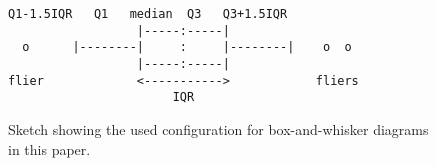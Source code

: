 \begin{figure}[htb]
    \centering
\begin{Verbatim}[fontsize=\footnotesize,frame=single,samepage=true]
     Q1-1.5IQR   Q1   median  Q3   Q3+1.5IQR
                  |-----:-----|
  o      |--------|     :     |--------|    o  o
                  |-----:-----|
flier             <----------->            fliers
                       IQR
\end{Verbatim}
    \caption{Sketch showing the used configuration for box-and-whisker diagrams in this paper.}
    \label{fig:box-config}
\end{figure}

